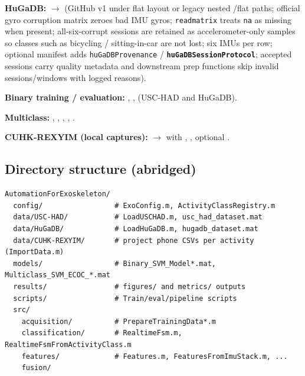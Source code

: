 \documentclass[11pt,a4paper]{article}
\begin{document}
\textbf{HuGaDB:}  $\rightarrow$  (GitHub v1 under  flat layout or legacy nested /flat paths; official gyro corruption matrix zeroes bad IMU gyros; \texttt{readmatrix} treats \texttt{na} as missing when present; all-six-corrupt sessions are retained as accelerometer-only samples so classes such as bicycling / sitting-in-car are not lost; six IMUs per row; optional manifest adds \texttt{huGaDBProvenance} / \textbf{\texttt{huGaDBSessionProtocol}}; accepted sessions carry quality metadata and downstream prep functions skip invalid sessions/windows with logged reasons).

\textbf{Binary training / evaluation:} , ,  (USC-HAD and HuGaDB).

\textbf{Multiclass:} , , , , .

\textbf{CUHK-REXYIM (local captures):}  $\rightarrow$  with , , optional .

\subsection{Directory structure (abridged)}
\begin{verbatim}
AutomationForExoskeleton/
  config/                 # ExoConfig.m, ActivityClassRegistry.m
  data/USC-HAD/           # LoadUSCHAD.m, usc_had_dataset.mat
  data/HuGaDB/            # LoadHuGaDB.m, hugadb_dataset.mat
  data/CUHK-REXYIM/       # project phone CSVs per activity (ImportData.m)
  models/                 # Binary_SVM_Model*.mat, Multiclass_SVM_ECOC_*.mat
  results/                # figures/ and metrics/ outputs
  scripts/                # Train/eval/pipeline scripts
  src/
    acquisition/          # PrepareTrainingData*.m
    classification/       # RealtimeFsm.m, RealtimeFsmFromActivityClass.m
    features/             # Features.m, FeaturesFromImuStack.m, ...
    fusion/
\end{verbatim}
\end{document}
